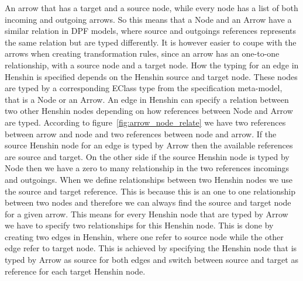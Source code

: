 An arrow that has a target and a source node, while every node has a list
of both incoming and outgoing arrows. So this means that a Node and an Arrow have a
similar relation in DPF models, where source and outgoings references represents
the same relation but are typed differently. It is however easier to coupe with
the arrows when creating transformation rules, since an arrow has an
one-to-one relationship, with a source node and a target node. How the typing
for an edge in Henshin is specified depends on the Henshin source and target
node. These nodes are typed by a corresponding EClass type from the
specification meta-model, that is a Node or an Arrow. An edge in Henshin can
specify a relation between two other Henshin nodes depending on how references
between Node and Arrow are typed. According to
figure~\ref{fig:arrow_node_relate} we have two references between arrow and
node and two references between node and arrow. If the source Henshin node for
an edge is typed by Arrow then the available references are source and target.
On the other side if the source Henshin node is typed by Node then we have a
zero to many relationship in the two references incomings and outgoings. When we
define relationships between two Henshin nodes we use the source and target
reference. This is because this is an one to one relationship between two nodes
and therefore we can always find the source and target node for a given arrow.
This means for every Henshin node that are typed by Arrow we have to specify two
relationships for this Henshin node. This is done by creating two edges in
Henshin, where one refer to source node while the other edge refer to
target node. This is achieved by specifying the Henshin node that is typed by
Arrow as source for both edges and switch between source and target as reference
for each target Henshin node. 

